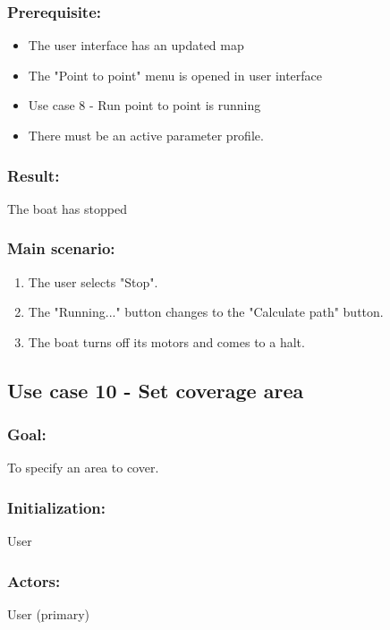 \subsubsection*{Prerequisite:}
\begin{itemize}
	\item The user interface has an updated map
	\item The "Point to point" menu is opened in user interface
	\item Use case 8 - Run point to point is running
	\item There must be an active parameter profile.
	
\end{itemize}

\subsubsection*{Result:}
The boat has stopped

\subsubsection*{Main scenario:}
\begin{enumerate}
	\item The user selects "Stop".
	\item The "Running..." button changes to the "Calculate path" button.
	\item The boat turns off its motors and comes to a halt.
\end{enumerate}	


\subsection{Use case 10 - Set coverage area}
\subsubsection*{Goal:}
To specify an area to cover.

\subsubsection*{Initialization:}
User

\subsubsection*{Actors:}
User (primary)

